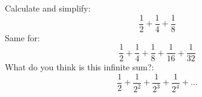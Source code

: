 Calculate and simplify:
    $$\frac{1}{2} + \frac{1}{4} + \frac{1}{8}$$
Same for:
    $$\frac{1}{2} + \frac{1}{4} + \frac{1}{8} + \frac{1}{16} + \frac{1}{32}$$
What do you think is this infinite sum?:
    $$\frac{1}{2} + \frac{1}{2^2} + \frac{1}{2^3} + \frac{1}{2^4} + \dots$$
